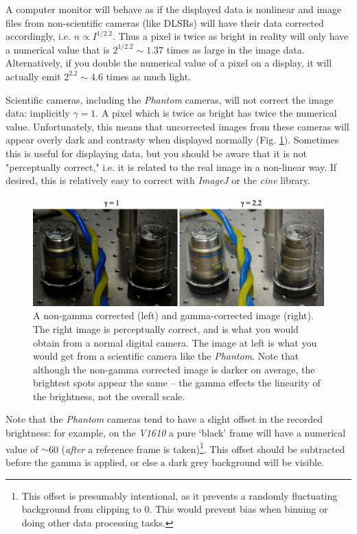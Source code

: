 \documentclass[11pt]{amsart}
\begin{document}
A computer monitor will behave as if the displayed data is nonlinear and image files from non-scientific cameras (like DLSRs) will have their data corrected accordingly, i.e. $n \propto I^{1/2.2}$.
Thus a pixel is twice as bright in reality will only have a numerical value that is $2^{1/2.2} \sim 1.37$ times as large in the image data.  
Alternatively, if you double the numerical value of a pixel on a display, it will actually emit $2^{2.2} \sim 4.6$ times as much light.

Scientific cameras, including the \emph{Phantom} cameras, will not correct the image data: implicitly $\gamma = 1$.
A pixel which is twice as bright has twice the numerical value.
Unfortunately, this means that uncorrected images from these cameras will appear overly dark and contrasty when displayed normally (Fig. \ref{fig:gamma}).
Sometimes this is useful for displaying data, but you should be aware that it is not "perceptually correct," i.e. it is related to the real image in a non-linear way.
If desired, this is relatively easy to correct with \emph{ImageJ} or the \emph{cine} library.



\begin{figure}
\includegraphics{figures/gamma-300dpi.jpg}
\caption{A non-gamma corrected (left) and gamma-corrected image (right).  The right image is perceptually correct, and is what you would obtain from a normal digital camera.  The image at left is what you would get from a scientific camera like the \emph{Phantom}.  Note that although the non-gamma corrected image is darker on average, the brightest spots appear the same -- the gamma effects the linearity of the brightness, not the overall scale.}
\label{fig:gamma}
\end{figure}

Note that the \emph{Phantom} cameras tend to have a slight offset in the recorded brightness: for example, on the \emph{V1610} a pure `black' frame will have a numerical value of $\sim$60 (\emph{after} a reference frame is taken)\footnote{This offset is presumably intentional, as it prevents a randomly fluctuating background from clipping to 0.  This would prevent bias when binning or doing other data processing tasks.}.
This offset should be subtracted before the gamma is applied, or else a dark grey background will be visible.
\end{document}
